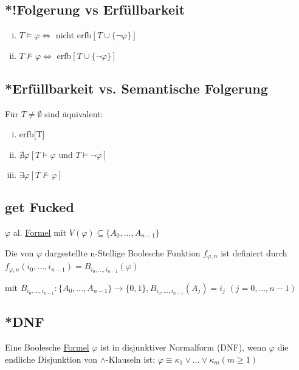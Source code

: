 \documentclass[12pt,a4paper]{article} %
\begin{document}
	\subsection{*!Folgerung vs Erfüllbarkeit}
	\begin{enumerate}[(i)]
		\item $T \hyperref[Erfullbar]{\vDash} \varphi \Leftrightarrow$ nicht erfb$[T \cup \{\neg \varphi\}]$ \newline
		\item $T \nvDash \varphi \Leftrightarrow$ erfb$[T \cup \{\neg \varphi\}]$
	\end{enumerate}

	\subsection{*Erfüllbarkeit vs. Semantische Folgerung}
	Für $T \ne \emptyset$ sind äquivalent:
	
	\begin{enumerate}[(i)]
		\item erfb[T]
		\item $\nexists \varphi[T \hyperref[Erfullbar]{\vDash} \varphi \text{ und } T \hyperref[Erfullbar]{\vDash} \neg \varphi]$
		\item $\exists \varphi [T \nvDash \varphi]$
	\end{enumerate}

	\subsection{get Fucked}
	$\varphi$ al. \hyperref[Formel]{Formel} mit $V(\varphi) \subseteq \{A_0, ..., A_{n - 1}\}$
	
	Die von $\varphi$ dargestellte n-Stellige Boolesche Funktion $f_{\varphi, n}$ ist definiert durch $f_{\varphi, n}(i_0, ..., i_{n-1}) = \widehat{B}_{i_0, ..., i_{n - 1}}(\varphi)$
	
	mit $B_{i_0, ..., i_{n - 1}}: \{A_0, ..., A_{n - 1}\} \rightarrow \{0, 1\}, B_{i_0, ..., i_{n - 1}}(A_j) = i_j$ $(j = 0, ..., n - 1)$
	
	\subsection{*DNF}
	\label{DNF}
	Eine Boolesche \hyperref[Formel]{Formel} $\varphi$ ist in disjunktiver Normalform (DNF), wenn
	$\varphi$ die endliche Disjunktion von $\land$-Klauseln ist: $\varphi \equiv \kappa_1 \lor ... \lor \kappa_m (m \ge 1)$
	
\end{document}
